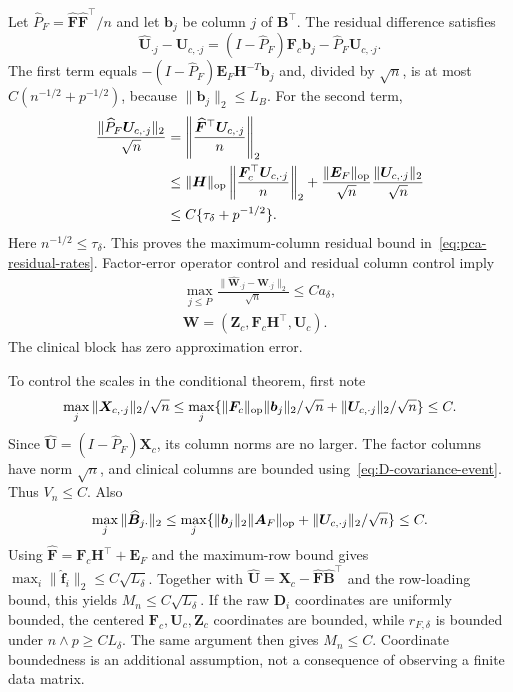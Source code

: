 Let $\widehat P_F=\widehat{\bm{F}}\widehat{\bm{F}}^\top/n$ and let $\bm{b}_j$ be column $j$ of $\bm{B}^\top$. The residual difference satisfies
\begin{equation}
 \widehat{\bm{U}}_{\cdot j}-\bm{U}_{c,\cdot j}
   =(I-\widehat P_F)\bm{F}_c\bm{b}_j-\widehat P_F\bm{U}_{c,\cdot j}.
 \label{eq:D-residual-difference}
\end{equation}
The first term equals $-(I-\widehat P_F)\bm{E}_F\bm{H}^{-T}\bm{b}_j$ and, divided by $\sqrt n$, is at most $C(n^{-1/2}+p^{-1/2})$, because $\|\bm{b}_j\|_2\le L_B$. For the second term,
\begin{align*}
 \frac{\|\widehat P_F\bm{U}_{c,\cdot j}\|_2}{\sqrt n}
 &=\left\|\frac{\widehat{\bm{F}}^\top \bm{U}_{c,\cdot j}}n\right\|_2\\
 &\le\|\bm{H}\|_{\rm op}\left\|\frac{\bm{F}_c^\top \bm{U}_{c,\cdot j}}n\right\|_2
       +\frac{\|\bm{E}_F\|_{\rm op}}{\sqrt n}
        \frac{\|\bm{U}_{c,\cdot j}\|_2}{\sqrt n}\\
 &\le C\{\tau_\delta+p^{-1/2}\}.
\end{align*}
Here $n^{-1/2}\le\tau_\delta$. This proves the maximum-column residual bound in~\eqref{eq:pca-residual-rates}. Factor-error operator control and residual column control imply
\begin{equation}
 \begin{gathered}
\max_{j\le P}\frac{\|\widehat{\bm{W}}_{\cdot j}-\bm{W}_{\cdot j}\|_2}{\sqrt n}
       \le Ca_\delta,
 \\
 \bm{W}=(\bm{Z}_c,\bm{F}_c\bm{H}^\top,\bm{U}_c).
 \end{gathered}
 \label{eq:D-design-column-error}
\end{equation}
The clinical block has zero approximation error.

To control the scales in the conditional theorem, first note
\[
 \max_j\|\bm{X}_{c,\cdot j}\|_2/\sqrt n
 \le\max_j\{\|\bm{F}_c\|_{\rm op}\|\bm{b}_j\|_2/\sqrt n
                     +\|\bm{U}_{c,\cdot j}\|_2/\sqrt n\}\le C.
\]
Since $\widehat{\bm{U}}=(I-\widehat P_F)\bm{X}_c$, its column norms are no larger. The factor columns have norm $\sqrt n$, and clinical columns are bounded using~\eqref{eq:D-covariance-event}. Thus $V_n\le C$.
Also
\[
 \max_j\|\widehat{\bm{B}}_{j\cdot}\|_2
 \le\max_j\{\|\bm{b}_j\|_2\|\bm{A}_F\|_{\rm op}
                    +\|\bm{U}_{c,\cdot j}\|_2/\sqrt n\}\le C.
\]
Using $\widehat{\bm{F}}=\bm{F}_c\bm{H}^\top+\bm{E}_F$ and the maximum-row bound gives $\max_i\|\widehat{\bm{f}}_i\|_2\le C\sqrt{L_\delta}$. Together with $\widehat{\bm{U}}=\bm{X}_c-\widehat{\bm{F}}\widehat{\bm{B}}^\top$ and the row-loading bound, this yields $M_n\le C\sqrt{L_\delta}$. If the raw $\bm{D}_i$ coordinates are uniformly bounded, the centered $\bm{F}_c,\bm{U}_c,\bm{Z}_c$ coordinates are bounded, while $r_{F,\delta}$ is bounded under $n\wedge p\ge CL_\delta$. The same argument then gives $M_n\le C$. Coordinate boundedness is an additional assumption, not a consequence of observing a finite data matrix.

